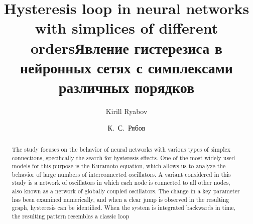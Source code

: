 \begin{englishtitle}
\title{Hysteresis loop in neural networks with simplices of different orders}
\author{Kirill Ryabov}

\maketitle

\begin{abstract}
The study focuses on the behavior of neural networks with various types of simplex connections, specifically the search for hysteresis effects. One of the most widely used models for this purpose is the Kuramoto equation, which allows us to analyze the behavior of large numbers of interconnected oscillators. A variant considered in this study is a network of oscillators in which each node is connected to all other nodes, also known as a network of globally coupled oscillators. The change in a key parameter has been examined numerically, and when a clear jump is observed in the resulting graph, hysteresis can be identified. When the system is integrated backwards in time, the resulting pattern resembles a classic loop

\end{abstract}
\end{englishtitle}

\title{Явление гистерезиса в нейронных сетях с симплексами различных порядков }
\author{К.~С.~Рябов
} %

\maketitle


